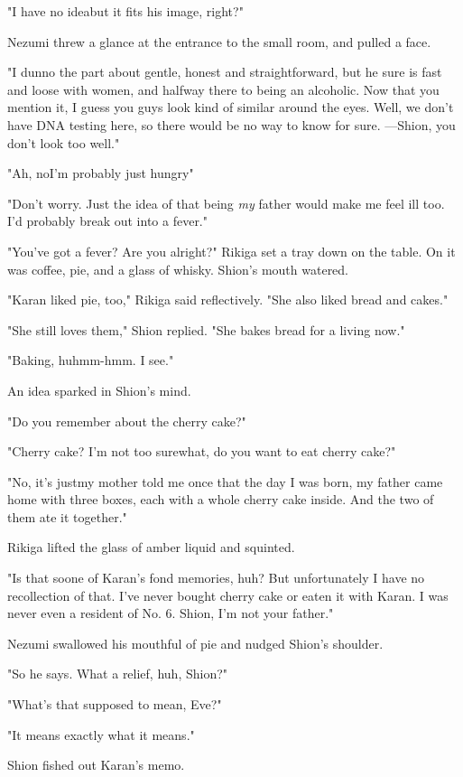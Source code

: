 "I have no idea\el but it fits his image, right?"

Nezumi threw a glance at the entrance to the small room, and pulled a
face.

"I dunno the part about gentle, honest and straightforward, but he sure
is fast and loose with women, and halfway there to being an alcoholic.
Now that you mention it, I guess you guys look kind of similar around
the eyes. Well, we don't have DNA testing here, so there would be no way
to know for sure. ---Shion, you don't look too well."

"Ah, no\el I'm probably just hungry\el "

"Don't worry. Just the idea of that being \emph{my} father would make me feel
ill too. I'd probably break out into a fever."

"You've got a fever? Are you alright?" Rikiga set a tray down on the
table. On it was coffee, pie, and a glass of whisky. Shion's mouth
watered.

"Karan liked pie, too," Rikiga said reflectively. "She also liked bread
and cakes."

"She still loves them," Shion replied. "She bakes bread for a living
now."

"Baking, huh\el mm-hmm. I see."

An idea sparked in Shion's mind.

"Do you remember about the cherry cake?"

"Cherry cake? I'm not too sure\el what, do you want to eat cherry cake?"

"No, it's just\el my mother told me once that the day I was born, my
father came home with three boxes, each with a whole cherry cake inside.
And the two of them ate it together."

Rikiga lifted the glass of amber liquid and squinted.

"Is that so\el one of Karan's fond memories, huh? But unfortunately I
have no recollection of that. I've never bought cherry cake or eaten it
with Karan. I was never even a resident of No. 6. Shion, I'm not your
father."

Nezumi swallowed his mouthful of pie and nudged Shion's shoulder.

"So he says. What a relief, huh, Shion?"

"What's that supposed to mean, Eve?"

"It means exactly what it means."

Shion fished out Karan's memo.


